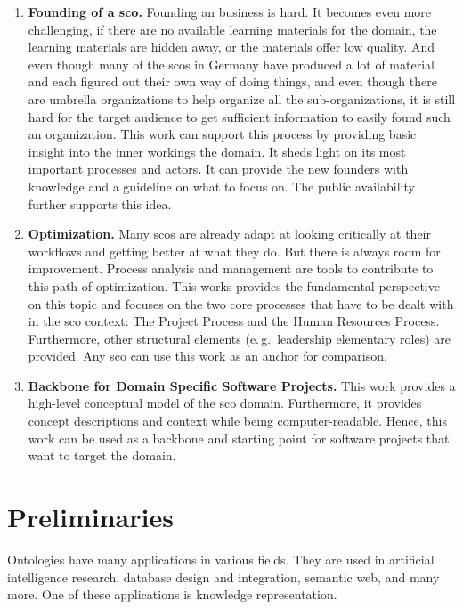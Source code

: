 \documentclass[a4paper, DIV=13, BCOR=0cm]{scrbook}
\newcommand{\eg}{e.\,g.\ }
\begin{document}
\begin{enumerate}
	\item \textbf{Founding of a \gls{sco}.} Founding an business is hard. It becomes even more challenging, if there are no available learning materials for the domain, the learning materials are hidden away, or the materials offer low quality. And even though many of the \glspl{sco} in Germany have produced a lot of material and each figured out their own way of doing things, and even though there are umbrella organizations to help organize all the sub-organizations, it is still hard for the target audience to get sufficient information to easily found such an organization. This work can support this process by providing basic insight into the inner workings the domain. It sheds light on its most important processes and actors. It can provide the new founders with knowledge and a guideline on what to focus on. The public availability further supports this idea.
	\item \textbf{Optimization.} Many \glspl{sco} are already adapt at looking critically at their workflows and getting better at what they do. But there is always room for improvement. Process analysis and management are tools to contribute to this path of optimization. This works provides the fundamental perspective on this topic and focuses on the two core processes that have to be dealt with in the \gls{sco} context: The Project Process and the Human Resources Process. Furthermore, other structural elements (\eg leadership elementary roles) are provided. Any \gls{sco} can use this work as an anchor for comparison.
	\item \textbf{Backbone for Domain Specific Software Projects.} This work provides a high-level conceptual model of the \gls{sco} domain. Furthermore, it provides concept descriptions and context while being computer-readable. Hence, this work can be used as a backbone and starting point for software projects that want to target the domain.
\end{enumerate}

\chapter[Preliminaries \\\textcolor{gray}{
	{\footnotesize \textsl{Gives the background of this work and prepares for the subsequent elucidation.}}
}]{Preliminaries}
Ontologies have many applications in various fields. They are used in artificial intelligence research, database design and integration, semantic web, and many more. \cite[p.\,1]{Gomez-Perez:2004aa} One of these applications is knowledge representation.
\end{document}

